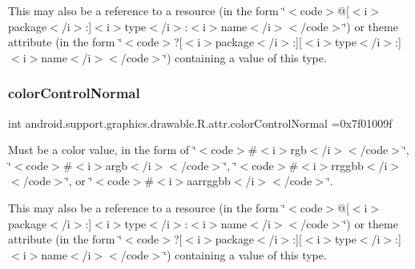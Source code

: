 This may also be a reference to a resource (in the form \char`\"{}$<$code$>$@\mbox{[}$<$i$>$package$<$/i$>$\+:\mbox{]}$<$i$>$type$<$/i$>$\+:$<$i$>$name$<$/i$>$$<$/code$>$\char`\"{}) or theme attribute (in the form \char`\"{}$<$code$>$?\mbox{[}$<$i$>$package$<$/i$>$\+:\mbox{]}\mbox{[}$<$i$>$type$<$/i$>$\+:\mbox{]}$<$i$>$name$<$/i$>$$<$/code$>$\char`\"{}) containing a value of this type. \mbox{\label{classandroid_1_1support_1_1graphics_1_1drawable_1_1R_1_1attr_ae13580c7f657a3c0bcab29d6e7de54cf}} 
\subsubsection{\texorpdfstring{color\+Control\+Normal}{colorControlNormal}}
{\footnotesize\ttfamily int android.\+support.\+graphics.\+drawable.\+R.\+attr.\+color\+Control\+Normal =0x7f01009f\hspace{0.3cm}{\ttfamily [static]}}

Must be a color value, in the form of \char`\"{}$<$code$>$\#$<$i$>$rgb$<$/i$>$$<$/code$>$\char`\"{}, \char`\"{}$<$code$>$\#$<$i$>$argb$<$/i$>$$<$/code$>$\char`\"{}, \char`\"{}$<$code$>$\#$<$i$>$rrggbb$<$/i$>$$<$/code$>$\char`\"{}, or \char`\"{}$<$code$>$\#$<$i$>$aarrggbb$<$/i$>$$<$/code$>$\char`\"{}. 

This may also be a reference to a resource (in the form \char`\"{}$<$code$>$@\mbox{[}$<$i$>$package$<$/i$>$\+:\mbox{]}$<$i$>$type$<$/i$>$\+:$<$i$>$name$<$/i$>$$<$/code$>$\char`\"{}) or theme attribute (in the form \char`\"{}$<$code$>$?\mbox{[}$<$i$>$package$<$/i$>$\+:\mbox{]}\mbox{[}$<$i$>$type$<$/i$>$\+:\mbox{]}$<$i$>$name$<$/i$>$$<$/code$>$\char`\"{}) containing a value of this type. \mbox{\label{classandroid_1_1support_1_1graphics_1_1drawable_1_1R_1_1attr_a32f9573690e6c49128663fefcac1c89a}} 
